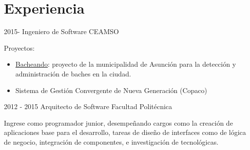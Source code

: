 \documentclass[]{friggeri-cv}
\begin{document}
\section{Experiencia}
\begin{entrylist}
\entry
    {2015-}
    {Ingeniero de Software}
    {CEAMSO}
    { 
        Proyectos:
        \begin{itemize}
            \item \href{http://bacheando.com/}{Bacheando}: proyecto de la
                municipalidad de Asunción para la detección y administración de
                baches en la ciudad.
            \item Sistema de Gestión Convergente de Nueva Generación (Copaco)
        \end{itemize}}

\entry
    {2012 - 2015}
    {Arquitecto de Software}
    {Facultad Politécnica}
    { Ingrese como programador junior, desempeñando cargos como la creación de
        aplicaciones base para el desarrollo, tareas de diseño de interfaces
        como de lógica de negocio, integración de componentes, e investigación
        de tecnológicas.

}
\end{entrylist}
\end{document}
